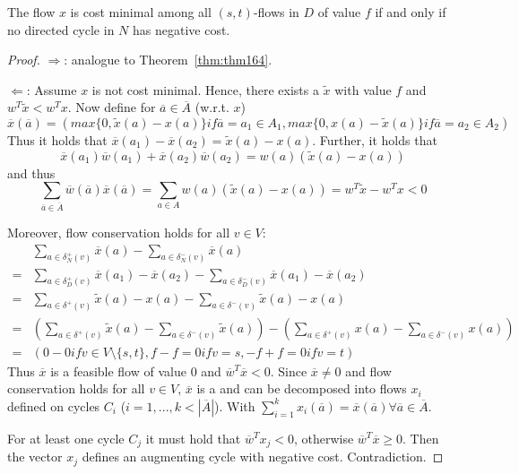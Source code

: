 \begin{thm}
The flow $x$ is cost minimal among all $(s,t)$-flows in $D$ of value $f$ if
and only if no directed cycle in $N$ has negative cost.
\end{thm}
\begin{proof}
$\Rightarrow$: analogue to Theorem~\ref{thm:thm164}.

$\Leftarrow$: Assume $x$ is not cost minimal. Hence, there exists a
$\tilde{x}$ with value $f$ and $w^T\tilde{x} < w^Tx$.
Now define for $\overline{a} \in \overline{A}$ (w.r.t. $x$)
\[
	\overline{x}(\overline{a}) = ( max \{ 0, \tilde{x}(a) - x(a) \} if
	\overline{a} = a_1 \in A_1, max \{0, x(a) - \tilde{x}(a)\} if
	\overline{a} = a_2 \in A_2 )
\]
Thus it holds that $\overline{x}(a_1) - \overline{x}(a_2) = \tilde{x}(a) -
x(a)$. Further, it holds that 
\[
	\overline{x}(a_1) \overline{w}(a_1) + \overline{x}(a_2) \overline{w}(a_2)
	= w(a) ( \tilde{x}(a) - x(a) )
\]
and thus
\[
	\sum_{\overline{a} \in \overline{A}} \overline{w}(\overline{a})
	\overline{x}(\overline{a}) = 
	\sum_{a \in A} w(a) ( \tilde{x}(a) - x(a) ) = w^T \tilde{x} - w^Tx < 0
\]

Moreover, flow conservation holds for all $v \in V$:
\begin{align*}
	&\sum_{a \in \delta^+_N(v)} \overline{x}(a) - \sum_{a \in \delta^-_N(v)}
	\overline{x}(a) \\
	= &\sum_{a \in \delta^+_D(v)} \overline{x}(a_1) -
	\overline{x}(a_2) - \sum_{a \in \delta^-_D(v)} \overline{x}(a_1) -
	\overline{x}(a_2) \\
	= &\sum_{a \in \delta^+(v)} \tilde{x}(a) - x(a) - \sum_{a \in
	\delta^-(v)} \tilde{x}(a) - x(a) \\
	= &\left( \sum_{a \in \delta^+(v)} \tilde{x}(a) - \sum_{a \in
	\delta^-(v)} \tilde{x}(a) \right) - 
	\left( \sum_{a \in \delta^+(v)} x(a) - \sum_{a \in
	\delta^-(v)} x(a) \right) \\
	= &( 0 - 0 if v \in V \setminus \{s,t\},
	f - f = 0 if v = s,
	-f + f = 0 if v = t )
\end{align*}
Thus $\overline{x}$ is a feasible flow of value $0$ and
$\overline{w}^T\overline{x} < 0$.
Since $\overline{x} \neq 0$ and flow conservation holds for all $v \in V$,
$\overline{x}$ is a  and can be decomposed
into flows $x_i$ defined on cycles $C_i$ ($i = 1, ..., k < |\overline{A}|$).
With $\sum_{i=1}^k x_i(\overline{a}) = \overline{x}(\overline{a}) \forall
\overline{a} \in \overline{A}$.

For at least one cycle $C_j$ it must hold that $\overline{w}^T x_j < 0$,
otherwise $\overline{w}^T \overline{x} \geq 0$. Then the vector $x_j$
defines an augmenting cycle with negative cost.
Contradiction.
\end{proof}
